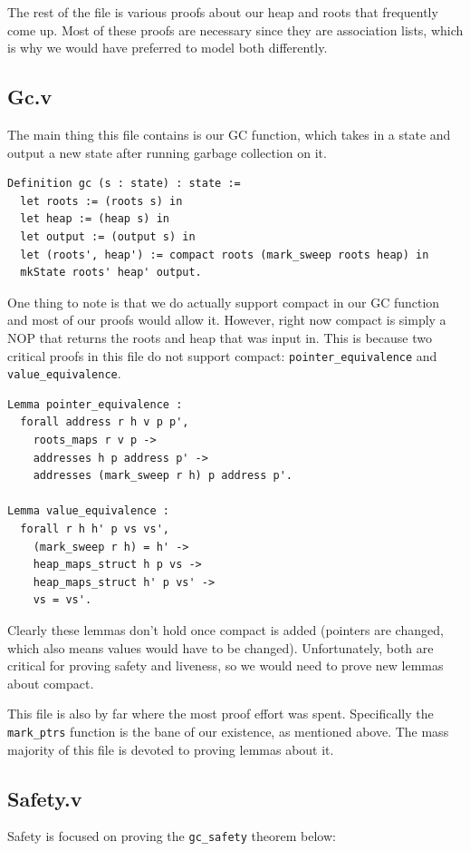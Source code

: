 \documentclass{article}
\begin{document}
The rest of the file is various proofs about our heap and roots that frequently come up. Most of these proofs are necessary since they are association lists, which is why we would have preferred to model both differently.

\subsection{Gc.v}
The main thing this file contains is our GC function, which takes in a state and output a new state after running garbage collection on it.

\begin{lstlisting}
Definition gc (s : state) : state :=
  let roots := (roots s) in
  let heap := (heap s) in
  let output := (output s) in
  let (roots', heap') := compact roots (mark_sweep roots heap) in
  mkState roots' heap' output.
\end{lstlisting}

One thing to note is that we do actually support compact in our GC function and most of our proofs would allow it. However, right now compact is simply a NOP that returns the roots and heap that was input in. This is because two critical proofs in this file do not support compact: \lstinline|pointer_equivalence| and \lstinline|value_equivalence|.

\begin{lstlisting}
Lemma pointer_equivalence :
  forall address r h v p p',
    roots_maps r v p ->
    addresses h p address p' ->
    addresses (mark_sweep r h) p address p'.

Lemma value_equivalence :
  forall r h h' p vs vs',
    (mark_sweep r h) = h' ->
    heap_maps_struct h p vs ->
    heap_maps_struct h' p vs' ->
    vs = vs'.
\end{lstlisting}

Clearly these lemmas don't hold once compact is added (pointers are changed, which also means values would have to be changed). Unfortunately, both are critical for proving safety and liveness, so we would need to prove new lemmas about compact.

This file is also by far where the most proof effort was spent. Specifically the \lstinline|mark_ptrs| function is the bane of our existence, as mentioned above. The mass majority of this file is devoted to proving lemmas about it.

\subsection{Safety.v}
Safety is focused on proving the \lstinline|gc_safety| theorem below:
\end{document}
